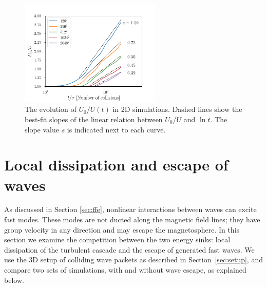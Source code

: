 \begin{figure}[h]
\centering
\includegraphics[width=0.6\textwidth]{pics/chap4/model2D}
\caption[The evolution of $U_0/U(t)$ in 2D simulations]{ 
The evolution of $U_0/U(t)$ in 2D simulations. Dashed lines show the best-fit slopes of the linear relation between $U_0/U$ and $\ln t$. The slope value $s$ is indicated next to each curve.}
\label{fit}
\end{figure}

\section{Local dissipation and escape of waves}
\label{sec:fate}

As discussed in Section \ref{sec:ffe}, nonlinear interactions between \alfven waves can excite fast modes. These modes are not ducted along the magnetic field lines; they have group velocity in any direction and may escape the magnetosphere. 
In this section we examine the competition between the two energy sinks: local dissipation of the turbulent cascade and the escape of generated fast waves. 
We use the 3D setup of colliding \alfven wave packets as described in Section~\ref{sec:setup}, and compare two sets of simulations, with and without wave escape, as explained below.
%
